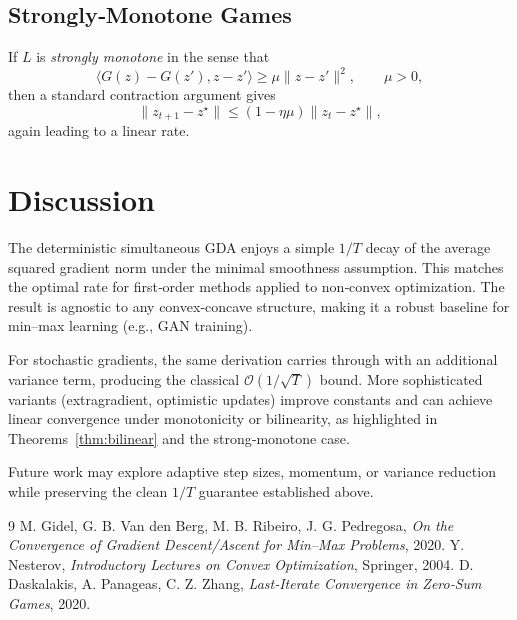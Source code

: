 \documentclass[11pt]{article}
\begin{document}
\subsection{Strongly‑Monotone Games}
If $L$ is \emph{strongly monotone} in the sense that
\[
\langle G(z)-G(z'),z-z'\rangle\ge \mu\|z-z'\|^{2},\qquad \mu>0,
\]
then a standard contraction argument gives
\[
\|z_{t+1}-z^{\star}\|\le (1-\eta\mu)\|z_{t}-z^{\star}\|,
\]
again leading to a linear rate.

\section{Discussion}
The deterministic simultaneous GDA enjoys a simple $1/T$ decay of the average squared gradient norm under the minimal smoothness assumption. This matches the optimal rate for first‑order methods applied to non‑convex optimization. The result is agnostic to any convex‑concave structure, making it a robust baseline for min–max learning (e.g., GAN training).  

For stochastic gradients, the same derivation carries through with an additional variance term, producing the classical $\mathcal{O}(1/\sqrt{T})$ bound. More sophisticated variants (extragradient, optimistic updates) improve constants and can achieve linear convergence under monotonicity or bilinearity, as highlighted in Theorems~\ref{thm:bilinear} and the strong‑monotone case.

Future work may explore adaptive step sizes, momentum, or variance reduction while preserving the clean $1/T$ guarantee established above.

\begin{thebibliography}{9}
M. Gidel, G. B. Van den Berg, M. B. Ribeiro, J. G. Pedregosa, \emph{On the Convergence of Gradient Descent/Ascent for Min–Max Problems}, 2020.
Y. Nesterov, \emph{Introductory Lectures on Convex Optimization}, Springer, 2004.
D. Daskalakis, A. Panageas, C. Z. Zhang, \emph{Last‑Iterate Convergence in Zero‑Sum Games}, 2020.
\end{thebibliography}
\end{document}

